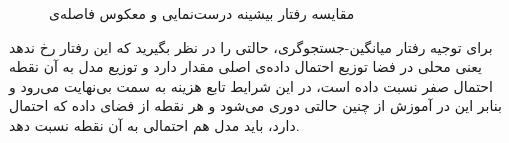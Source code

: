   \begin{figure}[!htb]
  	{
  		\begin{center}
  			\hspace{1cm}
  		\end{center}
  		\caption{مقایسه رفتار بیشینه درست‌نمایی و معکوس فاصله‌ی}
  		\label{Figure:MLE:MLEvsReverseKL}
  	}
  \end{figure}
 \newline
 برای توجیه رفتار میانگین-جستجوگری، حالتی را در نظر بگیرید که این رفتار رخ ندهد یعنی محلی در فضا توزیع احتمال داده‌ی اصلی مقدار دارد و توزیع مدل به آن نقطه احتمال صفر نسبت داده است، در این شرایط تابع هزینه به سمت بی‌نهایت می‌رود و بنابر این در آموزش از چنین حالتی دوری می‌شود و هر نقطه از فضای داده که احتمال دارد، باید مدل هم احتمالی به آن نقطه نسبت دهد.
